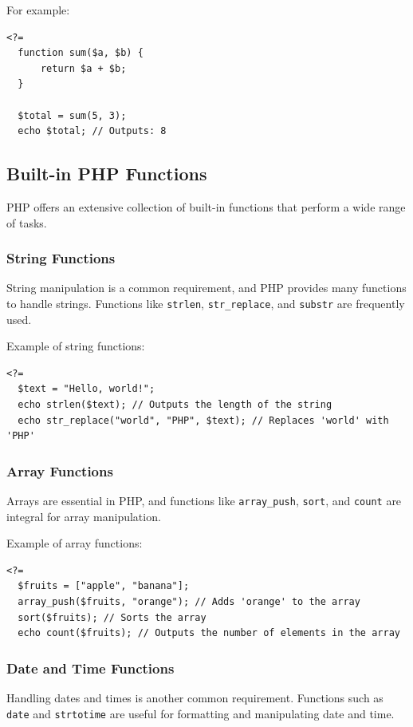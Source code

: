 \documentclass[11pt]{article}
\begin{document}
For example:

\begin{verbatim}
<?=
  function sum($a, $b) {
      return $a + $b;
  }

  $total = sum(5, 3);
  echo $total; // Outputs: 8
\end{verbatim}

\subsection{Built-in PHP Functions}
\label{sec:org611d081}
PHP offers an extensive collection of built-in functions that perform a
wide range of tasks.

\subsubsection{String Functions}
\label{sec:orgf5cfbeb}
String manipulation is a common requirement, and PHP provides many
functions to handle strings. Functions like \texttt{strlen}, \texttt{str\_replace}, and
\texttt{substr} are frequently used.

Example of string functions:

\begin{verbatim}
<?=
  $text = "Hello, world!";
  echo strlen($text); // Outputs the length of the string
  echo str_replace("world", "PHP", $text); // Replaces 'world' with 'PHP'
\end{verbatim}

\subsubsection{Array Functions}
\label{sec:org920feff}
Arrays are essential in PHP, and functions like \texttt{array\_push}, \texttt{sort},
and \texttt{count} are integral for array manipulation.

Example of array functions:

\begin{verbatim}
<?=
  $fruits = ["apple", "banana"];
  array_push($fruits, "orange"); // Adds 'orange' to the array
  sort($fruits); // Sorts the array
  echo count($fruits); // Outputs the number of elements in the array
\end{verbatim}

\subsubsection{Date and Time Functions}
\label{sec:org3761a0d}
Handling dates and times is another common requirement. Functions such
as \texttt{date} and \texttt{strtotime} are useful for formatting and manipulating
date and time.
\end{document}
